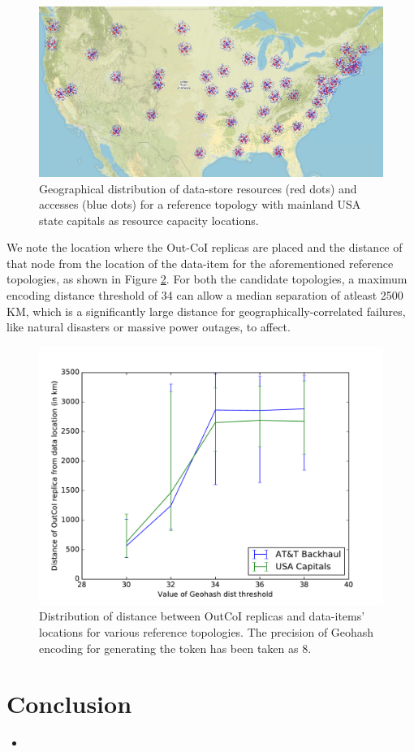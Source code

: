 \begin{figure}[h]
\centering
\includegraphics[width=0.75\columnwidth]{figures/fogstore/evals/fault-tolerance/map_accesses.jpg}
\caption{Geographical distribution of data-store resources (red dots) and accesses (blue dots) for a reference topology with mainland USA state capitals as resource capacity locations.}
\label{fig:faultToleranceTopo}
\end{figure}
We note the location where the Out-CoI replicas are placed and the distance of that node from the location of the data-item for the aforementioned reference topologies, as shown in Figure \ref{fig:outCoiDistance}. For both the candidate topologies, a maximum encoding distance threshold of 34 can allow a median separation of atleast 2500 KM, which is a significantly large distance for geographically-correlated failures, like natural disasters or massive power outages, to affect.
\begin{figure}[h]
\centering
\includegraphics[width=0.75\columnwidth]{figures/fogstore/evals/fault-tolerance/outCoiDist.pdf}
\caption{Distribution of distance between OutCoI replicas and data-items' locations for various reference topologies. The precision of Geohash encoding for generating the token has been taken as 8.}
\label{fig:outCoiDistance}
\end{figure}

\section{Conclusion}
\label{sec:conclusion}
\begin{itemize}
\item 
\end{itemize}